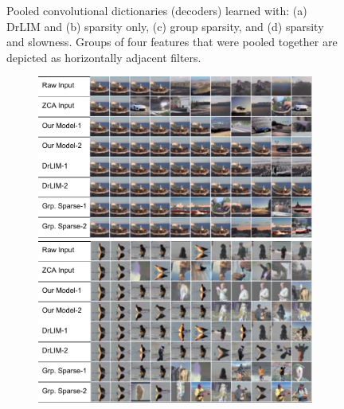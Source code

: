 \documentclass{article} %
\begin{document}
\begin{figure}[ht]
\begin{subfigure}[b]{\figsize}
        \caption{}
        \label{fig:slowfilters}
  \end{subfigure}
	\caption{Pooled convolutional dictionaries (decoders) learned with: (a) DrLIM and (b) sparsity only, (c) group sparsity, and (d) sparsity and slowness. Groups of four features that were pooled together are depicted as horizontally adjacent filters.}
  \label{fig:filters}
\end{figure}

\begin{figure}
  \center
  \begin{subfigure}[b]{0.45\textwidth}
  \includegraphics[width=\textwidth, trim = 0 0 34 0, clip]{./Rebbutal_Figures/NNtime1.pdf}
   \includegraphics[width=\textwidth, trim = 0 0 34 0, clip]{./Rebbutal_Figures/NNtime2.pdf}
        \caption{}
        \label{fig:videoquery}
  \end{subfigure}
  \centering \hspace{0.1cm}
  \begin{subfigure}[b]{0.45\textwidth}

\end{subfigure}
\end{figure}
\end{document}
